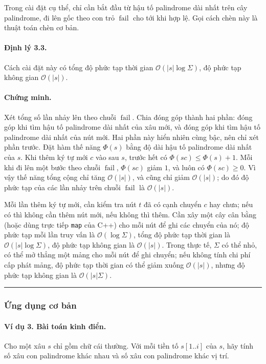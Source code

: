 \documentclass[11pt]{article}
\newcommand{\Oh}{\mathcal{O}}
\newcommand{\qedmark}{\hfill\rule{0.7ex}{0.7ex}}
\begin{document}
Trong cài đặt cụ thể, chỉ cần bắt đầu từ hậu tố palindrome dài nhất trên cây
palindrome, đi lên gốc theo con trỏ \(\operatorname{fail}\) cho tới khi hợp lệ.
Gọi cách chèn này là thuật toán chèn cơ bản.

\paragraph{Định lý 3.3.}
Cách cài đặt này có tổng độ phức tạp thời gian \(\Oh(|s|\log \Sigma)\), độ
phức tạp không gian \(\Oh(|s|)\).

\paragraph{Chứng minh.}
Xét tổng số lần nhảy lên theo chuỗi \(\operatorname{fail}\). Chia đóng góp
thành hai phần: đóng góp khi tìm hậu tố palindrome dài nhất của xâu mới, và
đóng góp khi tìm hậu tố palindrome dài nhất của nút mới. Hai phần này hiển
nhiên cùng bậc, nên chỉ xét phần trước. Đặt hàm thế năng \(\Phi(s)\) bằng độ
dài hậu tố palindrome dài nhất của \(s\). Khi thêm ký tự mới \(c\) vào sau
\(s\), trước hết có \(\Phi(sc)\le \Phi(s)+1\). Mỗi khi đi lên một bước theo
chuỗi \(\operatorname{fail}\), \(\Phi(sc)\) giảm \(1\), và luôn có
\(\Phi(sc)\ge 0\). Vì vậy thế năng tổng cộng chỉ tăng \(\Oh(|s|)\), và cũng
chỉ giảm \(\Oh(|s|)\); do đó độ phức tạp của các lần nhảy trên chuỗi
\(\operatorname{fail}\) là \(\Oh(|s|)\).

Mỗi lần thêm ký tự mới, cần kiểm tra nút \(t\) đã có cạnh chuyển \(c\) hay
chưa; nếu có thì không cần thêm nút mới, nếu không thì thêm. Cần xây một cây
cân bằng (hoặc dùng trực tiếp \texttt{map} của C++) cho mỗi nút để ghi các
chuyển của nó; độ phức tạp mỗi lần truy vấn là \(\Oh(\log \Sigma)\), tổng độ
phức tạp thời gian là \(\Oh(|s|\log \Sigma)\), độ phức tạp không gian là
\(\Oh(|s|)\). Trong thực tế, \(\Sigma\) có thể nhỏ, có thể mở thẳng một mảng
cho mỗi nút để ghi chuyển; nếu không tính chi phí cấp phát mảng, độ phức tạp
thời gian có thể giảm xuống \(\Oh(|s|)\), nhưng độ phức tạp không gian là
\(\Oh(|s|\Sigma)\). \qedmark

\subsubsection{Ứng dụng cơ bản}

\paragraph{Ví dụ 3. Bài toán kinh điển.}
Cho một xâu \(s\) chỉ gồm chữ cái thường. Với mỗi tiền tố \(s[1..i]\) của
\(s\), hãy tính số xâu con palindrome khác nhau và số xâu con palindrome khác
vị trí.
\end{document}
